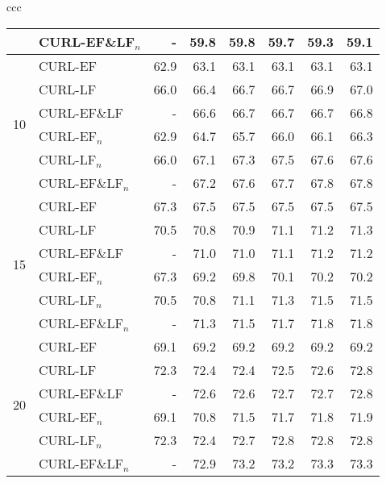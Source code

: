 \documentclass[journal,11pt]{IEEEtran}
\newcommand{\ADD}[1]{#1}
\newcommand{\emb}{embodiment}
\begin{document}
\begin{table*}[!ht]
\begin{center}
{\begin{tabular}{ccc}
\begin{tabular}{|r|l|rrrrrr|}
& CURL-EF\&LF$_n$ & - & 59.8 & 59.8 & 59.7 & 59.3 & 59.1 \\
\hline
\multirow{6}{*}{10}
& CURL-EF & 62.9 & 63.1 & 63.1 & 63.1 & 63.1 & 63.1 \\
& CURL-LF & 66.0 & 66.4 & 66.7 & 66.7 & 66.9 & 67.0 \\
& CURL-EF\&LF & - & 66.6 & 66.7 & 66.7 & 66.7 & 66.8 \\
& CURL-EF$_n$ & 62.9 & 64.7 & 65.7 & 66.0 & 66.1 & 66.3 \\
& CURL-LF$_n$ & 66.0 & 67.1 & 67.3 & 67.5 & 67.6 & 67.6 \\
& CURL-EF\&LF$_n$ & - & 67.2 & 67.6 & 67.7 & 67.8 & 67.8 \\
\hline
\multirow{6}{*}{15}
& CURL-EF & 67.3 & 67.5 & 67.5 & 67.5 & 67.5 & 67.5 \\
& CURL-LF & 70.5 & 70.8 & 70.9 & 71.1 & 71.2 & 71.3 \\
& CURL-EF\&LF & - & 71.0 & 71.0 & 71.1 & 71.2 & 71.2 \\
& CURL-EF$_n$ & 67.3 & 69.2 & 69.8 & 70.1 & 70.2 & 70.2 \\
& CURL-LF$_n$ & 70.5 & 70.8 & 71.1 & 71.3 & 71.5 & 71.5 \\
& CURL-EF\&LF$_n$ & - & 71.3 & 71.5 & 71.7 & 71.8 & 71.8 \\
\hline
\multirow{6}{*}{20}
& CURL-EF & 69.1 & 69.2 & 69.2 & 69.2 & 69.2 & 69.2 \\
& CURL-LF & 72.3 & 72.4 & 72.4 & 72.5 & 72.6 & 72.8 \\
& CURL-EF\&LF & - & 72.6 & 72.6 & 72.7 & 72.7 & 72.8 \\
& CURL-EF$_n$ & 69.1 & 70.8 & 71.5 & 71.7 & 71.8 & 71.9 \\
& CURL-LF$_n$ & 72.3 & 72.4 & 72.7 & 72.8 & 72.8 & 72.8 \\
& CURL-EF\&LF$_n$ & - & 72.9 & 73.2 & 73.2 & 73.3 & 73.3 \\
\hline
\end{tabular}



\\
\end{tabular}

}
\end{center}
\end{table*}%
\caption{Mean Average Precision (MAP) \ADD{of the CURL variants, in the (EP+LR) \emb,} varying the number of labeled images per class at the different co-training rounds obtained on the Caltech-101 data set in the three learning scenarios considered: inductive (left), transductive  (middle), and self-taught (right). \ADD{For clarity, the (EP+LR) suffixes have been omitted.}}
\end{document}
